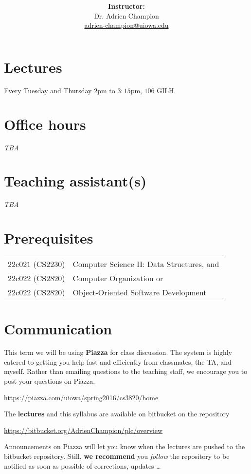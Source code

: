 \documentclass[10pt]{article}
\title{
  \articleTitle
}
\author{
  \textbf{Instructor:}\\
  Dr. Adrien Champion\\
  \href{mailto:adrien-champion@uiowa.edu}{adrien-champion@uiowa.edu}
}
\date{}
\newcommand{\ita}[1]{\textit{#1}}
\newcommand{\tba}{\ita{TBA}\xspace}
\begin{document}
\maketitle

\section*{Lectures}
Every Tuesday and Thursday $2$pm to $3:15$pm, $106$ GILH.


\section*{Office hours}
\tba


\section*{Teaching assistant(s)}
\tba


\section*{Prerequisites}
\begin{tabular}{l l}
  $22$c$021$ (CS$2230$) & Computer Science II: Data Structures, and \\
  $22$c$022$ (CS$2820$) & Computer Organization or \\
  $22$c$022$ (CS$2820$) & Object-Oriented Software Development
\end{tabular}


\section*{Communication}

This term we will be using \textbf{Piazza} for class discussion. The system is
highly catered to getting you help fast and efficiently from classmates, the
TA, and myself. Rather than emailing questions to the teaching staff, we
encourage you to post your questions on Piazza.

\centerline{
  \url{https://piazza.com/uiowa/spring2016/cs3820/home}
}

\noindent
The \textbf{lectures} and this syllabus are available on bitbucket on the
repository

\centerline{
  \url{https://bitbucket.org/AdrienChampion/plc/overview}
}

\noindent
Announcements on Piazza will let you know when the lectures are pushed to the
bitbucket repository. Still, \textbf{we recommend} you \ita{follow} the
repository to be notified as soon as possible of corrections, updates \ldots
\end{document}
